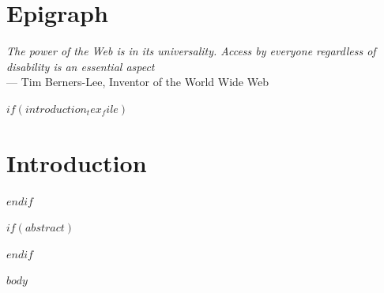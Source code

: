 \documentclass[
  justified,
  openright,
$if(classoption)$
  $for(classoption)$
    $classoption$$sep$,
  $endfor$
$endif$
]{tufte-book}
\begin{document}
\chapter*{Epigraph}
\thispagestyle{empty}
\begin{flushright}
  \vspace*{0.25\textheight}
  {\itshape The power of the Web is in its universality. Access by everyone regardless of disability is an essential aspect}\\[1em]
  --- Tim Berners-Lee, Inventor of the World Wide Web
\end{flushright}
\clearpage

\newpage
$if(introduction_tex_file)$
\chapter*{Introduction}

\clearpage
$endif$

\mainmatter
{} %

$if(abstract)$
\begin{abstract}
$abstract$
\end{abstract}
$endif$

$body$
\end{document}
